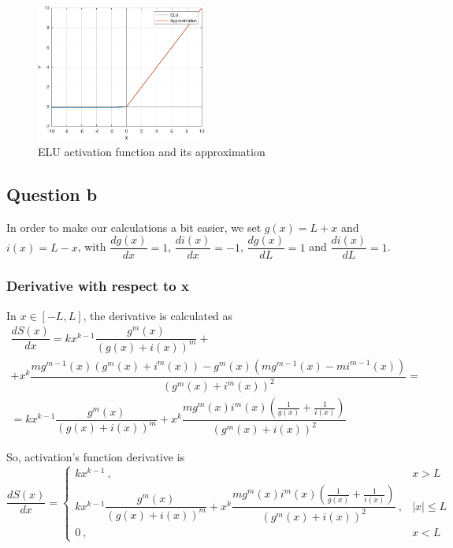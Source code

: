 \begin{figure}[H]
	\centering
	\includegraphics[width=0.5\textwidth]{../Problem 7/prob7_elu.pdf}
	\caption{ELU activation function and its approximation}
	\label{fig:prob7_elu}
\end{figure}


\subsection{Question b}
In order to make our calculations a bit easier, we set $g(x) = L+x$ and $i(x) = L-x$, with $\dfrac{dg(x)}{dx} = 1$, $\dfrac{di(x)}{dx} = -1$, $\dfrac{dg(x)}{dL} = 1$ and $\dfrac{di(x)}{dL} = 1$.

\subsubsection{Derivative with respect to x}
In $x \in \left[-L, L\right]$, the derivative is calculated as
\[
\begin{gathered}
\dfrac{dS(x)}{dx} = kx^{k-1} \dfrac{g^m(x)}{\left(g(x)+i(x)\right)^m} + \\[1mm]
+ x^k\dfrac{mg^{m-1}(x) \left( g^m(x) + i^m(x) \right) - g^m(x) \left( mg^{m-1}(x) - mi^{m-1}(x)\right)}{\left( g^m(x) + i^m(x) \right)^2} = \\[1mm]
= kx^{k-1} \dfrac{g^m(x)}{\left(g(x)+i(x)\right)^m} + x^k \dfrac{mg^m(x) i^m(x) \left( \frac{1}{g(x)} + \frac{1}{i(x)} \right)}{\left(g^m(x) + i(x)\right)^2}
\end{gathered}
\]

So, activation's function derivative is 
\begin{equation}
\frac{dS(x)}{dx} = \left\{
\begin{array}{cc}
	kx^{k-1} \ , & x>L\\[1mm]
	kx^{k-1} \dfrac{g^m(x)}{\left(g(x)+i(x)\right)^m} + x^k \dfrac{mg^m(x) i^m(x) \left( \frac{1}{g(x)} + \frac{1}{i(x)} \right)}{\left(g^m(x) + i(x)\right)^2}\ , & \left|x\right| \le L\\[1mm]
	0\ , & x<L
\end{array}
\right.
\end{equation}


